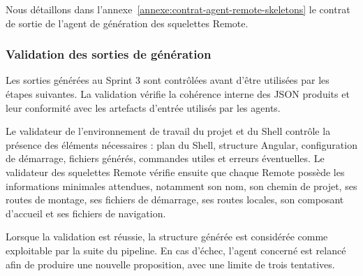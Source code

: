 Nous détaillons dans l'annexe~\ref{annexe:contrat-agent-remote-skeletons} le contrat de sortie de l'agent de génération des squelettes Remote.

\subsubsection{Validation des sorties de génération}

Les sorties générées au Sprint 3 sont contrôlées avant d'être utilisées par les étapes suivantes. La validation vérifie la cohérence interne des JSON produits et leur conformité avec les artefacts d'entrée utilisés par les agents.

Le validateur de l'environnement de travail du projet et du Shell contrôle la présence des éléments nécessaires : plan du Shell, structure Angular, configuration de démarrage, fichiers générés, commandes utiles et erreurs éventuelles. Le validateur des squelettes Remote vérifie ensuite que chaque Remote possède les informations minimales attendues, notamment son nom, son chemin de projet, ses routes de montage, ses fichiers de démarrage, ses routes locales, son composant d'accueil et ses fichiers de navigation.

Lorsque la validation est réussie, la structure générée est considérée comme exploitable par la suite du pipeline. En cas d'échec, l'agent concerné est relancé afin de produire une nouvelle proposition, avec une limite de trois tentatives.

